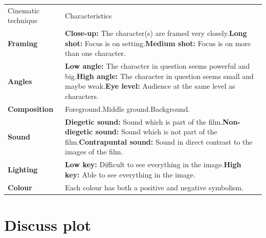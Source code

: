 \documentclass[11pt,a4paper,oneside]{book}
\begin{document}
{\small\setlength{\tabcolsep}{4pt}\renewcommand{\arraystretch}{1.3}\begin{tabularx}{\linewidth}{@{}>{\raggedright\arraybackslash}X>{\raggedright\arraybackslash}X@{}}\toprule
Cinematic technique & Characteristics\\
\textbf{Framing} & \textbf{Close-up:} The character(s) are framed very closely.\newline{}\newline{}\textbf{Long shot:} Focus is on setting.\newline{}\newline{}\textbf{Medium shot:} Focus is on more than one character.\\
\textbf{Angles} & \textbf{Low angle:} The character in question seems powerful and big.\newline{}\newline{}\textbf{High angle:} The character in question seems small and maybe weak.\newline{}\newline{}\textbf{Eye level:} Audience at the same level as characters.\\
\textbf{Composition} & Foreground.\newline{}\newline{}Middle ground.\newline{}\newline{}Background.\\
\textbf{Sound} & \textbf{Diegetic sound:} Sound which is part of the film.\newline{}\newline{}\textbf{Non-diegetic sound:} Sound which is not part of the film.\newline{}\newline{}\textbf{Contrapuntal sound:} Sound in direct contrast to the images of the film.\\
\textbf{Lighting} & \textbf{Low key:} Difficult to see everything in the image.\newline{}\newline{}\textbf{High key:} Able to see everything in the image.\\
\textbf{Colour} & Each colour has both a positive and negative symbolism.\\
\bottomrule\end{tabularx}}\par\medskip

\section*{Discuss plot}
\end{document}
